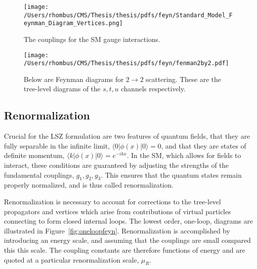 \begin{figure}[!htb]
 \center
 \caption[Illustrations of SM couplings]{
  The couplings for the SM gauge interactions.
 } 
 \texttt{[image: /Users/rhombus/CMS/Thesis/thesis/pdfs/feyn/Standard\_Model\_Feynman\_Diagram\_Vertices.png]}
    \label{fig:smcouplings}
\end{figure}
\begin{figure}[!htb]
 \center
 \caption[Feynman diagrams for $2\rightarrow2$ scattering]{
  Below are Feynman diagrams for $2\rightarrow2$ scattering. 
  These are the tree-level diagrams of the $s,t,u$
   channels respectively.
 } 
 \texttt{[image: /Users/rhombus/CMS/Thesis/thesis/pdfs/feyn/fenman2by2.pdf]}
    \label{fig:fenyman2by2}
\end{figure}

\subsection{Renormalization}
 Crucial for the LSZ formulation are
  two features of quantum fields,
  that they are fully separable in the 
  infinite limit,
  $\langle 0 | \phi(x) | 0 \rangle = 0$,
  and that they are states of definite momentum,
  $ \langle k | \phi(x) | 0 \rangle = e^{-ikx}$.
 In the SM, which
  allows for fields to interact, these
  conditions are guaranteed by adjusting the
  strengths of the fundamental couplings, $g_1,g_2,g_3$.
 This ensures that the quantum states
  remain properly normalized, and is thus
  called renormalization.

 Renormalization is necessary to account
  for corrections to the tree-level propagators
  and vertices which arise from contributions
  of virtual particles connecting to 
  form closed internal loops.
 The lowest order, one-loop, diagrams
  are illustrated in Figure~\ref{fig:oneloopfeyn}.
 Renormalization is accomplished by introducing an energy scale,
  and assuming that the couplings are small compared 
  this this scale. 
 The coupling constants are therefore
  functions of energy 
  and are quoted at a particular renormalization scale,
  $\mu_R$.
 


